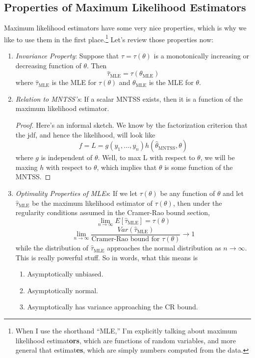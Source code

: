 \documentclass[a4paper,12pt]{scrartcl}
\begin{document}
\newpage
\subsection{Properties of Maximum Likelihood Estimators}

Maximum likelihood estimators have some very nice properties, which
is why we like to use them in the first place.\footnote{When I use
the shorthand ``MLE,'' I'm
explicitly talking about maximum likelihood estimat\textbf{ors},
which are functions of random variables, and more general that
estimat\textbf{es}, which are simply numbers computed from the data.}
Let's review those properties now:
\begin{enumerate}
   \item {\sl Invariance Property}: Suppose that $\tau = \tau(\theta)$
      is a monotonically increasing or decreasing function of
      $\theta$. Then
      \[ \hat{\tau}_{\text{MLE}} = \tau\left(\theta_{\text{MLE}}\right)
	 \]
      where $\hat{\tau}_{\text{MLE}}$ is the MLE for $\tau(\theta)$
      and $\theta_{\text{MLE}}$ is the MLE for $\theta$.
   \item {\sl Relation to MNTSS's}: If a scalar MNTSS exists,
      then it is a function of the maximum likelihood estimator.

      \begin{proof} Here's an informal sketch. We know by the
	 factorization criterion that the jdf, and hence the likelihood,
	 will look like
	    \[ f = L = g(y_1, \ldots, y_n) h(\hat{\theta}_\text{MNTSS},
	       \theta) \]
	 where $g$ is independent of $\theta$.
	 Well, to max L with respect to $\theta$, we will be maxing
	 $h$ with respect to $\theta$, which implies that $\theta$
	 is some function of the MNTSS.
      \end{proof}
   \item {\sl Optimality Properties of MLEs}: If we let $\tau(\theta)$
      be any function of $\theta$ and let $\hat{\tau}_{\text{MLE}}$
      be the maximum likelihood estimator of $\tau(\theta)$, then
      under the regularity conditions assumed in the Cramer-Rao
      bound section,
	 \[ \lim_{n\rightarrow \infty} E[\hat{\tau}_{\text{MLE}}]
	 = \tau(\theta) \]
	 \[ \lim_{n\rightarrow \infty}
	    \frac{ Var(\hat{\tau}_{\text{MLE}})}{\text{Cramer-Rao
	    bound for $\tau(\theta)$}} \rightarrow 1 \]
      while the distribution of $\hat{\tau}_{\text{MLE}}$ approaches
      the normal distribution as $n\rightarrow \infty$. This is really
      powerful stuff. So in words, what this means is
      \begin{enumerate}
	 \item Asymptotically unbiased.
	 \item Asymptotically normal.
	 \item Asymptotically has variance approaching the CR bound.
      \end{enumerate}
\end{enumerate}
\end{document}
